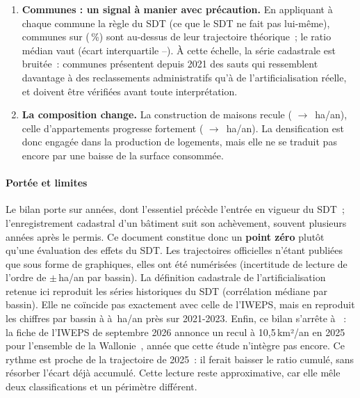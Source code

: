 \documentclass[11pt,a4paper]{report}
\newcommand{\haan}{\,ha/an}
\newcommand{\kmdan}{\,km²/an}
\begin{document}
\begin{enumerate}[leftmargin=1.4em]
\item \textbf{Communes : un signal à manier avec précaution.} En appliquant à chaque commune la règle du SDT (ce que le SDT ne fait pas lui-même), \NbAuDessus{} communes sur \NbCommunesSDT{} (\PartAuDessusPct\,\%) sont au-dessus de leur trajectoire théorique~; le ratio médian vaut \RatioMed{} (écart interquartile \RatioQa--\RatioQc). À cette échelle, la série cadastrale est bruitée~: \NbSautsSuivi{} communes présentent depuis 2021 des sauts qui ressemblent davantage à des reclassements administratifs qu'à de l'artificialisation réelle, et doivent être vérifiées avant toute interprétation.
\item \textbf{La composition change.} La construction de maisons recule (\MaisonsRef{} $\rightarrow$ \MaisonsObs\haan), celle d'appartements progresse fortement (\ApptRef{} $\rightarrow$ \ApptObs\haan). La densification est donc engagée dans la production de logements, mais elle ne se traduit pas encore par une baisse de la surface consommée.
\end{enumerate}

\paragraph{Portée et limites} Le bilan porte sur \NbAnneesObs{} années, dont l'essentiel précède l'entrée en vigueur du SDT~; l'enregistrement cadastral d'un bâtiment suit son achèvement, souvent plusieurs années après le permis. Ce document constitue donc un \textbf{point zéro} plutôt qu'une évaluation des effets du SDT. Les trajectoires officielles n'étant publiées que sous forme de graphiques, elles ont été numérisées (incertitude de lecture de l'ordre de $\pm$\IncertLecture\haan{} par bassin). La définition cadastrale de l'artificialisation retenue ici reproduit les séries historiques du SDT (corrélation médiane \ValPrincCorr{} par bassin). Elle ne coïncide pas exactement avec celle de l'IWEPS, mais en reproduit les chiffres par bassin à \CpdtEcartMin{} à \CpdtEcartMax\haan{} près sur 2021-2023. Enfin, ce bilan s'arrête à \AnneeFinObs~: la fiche de l'IWEPS de septembre 2026 annonce un recul à 10,5\kmdan{} en 2025 pour l'ensemble de la Wallonie~\citep{iweps_t005}, année que cette étude n'intègre pas encore. Ce rythme est proche de la trajectoire de 2025~: il ferait baisser le ratio cumulé, sans résorber l'écart déjà accumulé. Cette lecture reste approximative, car elle mêle deux classifications et un périmètre différent.
\end{document}
